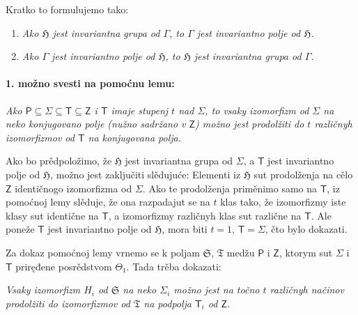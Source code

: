 \documentclass[11pt]{article}
\begin{document}
Kratko to formulujemo tako:

\begin{enumerate}
\item \emph{Ako \(\mathfrak H\) jest invariantna grupa od \(\Gamma\), to \(\Gamma\) jest invariantno polje od \(\mathfrak H\).}
\item \emph{Ako \(\Gamma\) jest invariantno polje od \(\mathfrak H\), to \(\mathfrak H\) jest invariantna grupa od \(\Gamma\).}
\end{enumerate}

\paragraph{1. možno svesti na pomoćnu lemu:}\label{laesst-sich-zurueckfuehren-auf-den-hilfssatz}

\emph{Ako \(\mathsf P \subseteq \Sigma \subseteq \mathsf T \subseteq \mathsf Z\) i \(\mathsf T\) imaje stupenj \(t\) nad \(\Sigma\), to vsaky izomorfizm od \(\Sigma\) na neko konjugovano polje (nužno sadržano v \(\mathsf Z\)) možno jest prodolžiti do \(t\) različnyh izomorfizmov od \(\mathsf T\) na konjugovana polja.}

Ako bo prědpoložimo, že \(\mathfrak H\) jest invariantna grupa od \(\Sigma\), a \(\mathsf T\) jest invariantno polje od \(\mathfrak H\), možno jest zaključiti slědujuće: Elementi iz \(\mathfrak H\) sut prodolženja na cělo \(\mathsf Z\) identičnogo izomorfizma od \(\Sigma\). Ako te prodolženja priměnimo samo na \(\mathsf T\), iz pomoćnoj lemy slěduje, že ona razpadajut se na \(t\) klas tako, že izomorfizmy iste klasy sut identične na \(\mathsf T\), a izomorfizmy različnyh klas sut različne na \(\mathsf T\). Ale poneže \(\mathsf T\) jest invariantno polje od \(\mathfrak H\), mora biti \(t=1\), \(\mathsf T=\Sigma\), čto bylo dokazati.

Za dokaz pomoćnoj lemy vrnemo se k poljam \(\mathfrak S\), \(\mathfrak T\) medžu \(\mathsf P\) i \(\mathsf Z\), ktorym sut \(\Sigma\) i \(\mathsf T\) priręđene posrědstvom \(\Theta_1\). Tada trěba dokazati:

\emph{Vsaky izomorfizm \(H_i\) od \(\mathfrak S\) na neko \(\Sigma_i\) možno jest na točno \(t\) različnyh načinov prodolžiti do izomorfizmov od \(\mathfrak T\) na podpolja \(\mathsf T_i\) od \(\mathsf Z\).}
\end{document}
